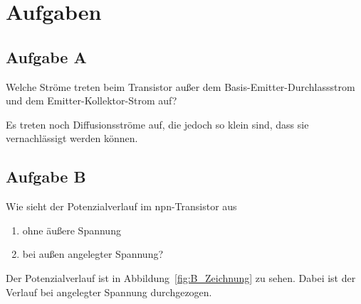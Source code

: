 \fehlt


\FloatBarrier
\section{Aufgaben}

\FloatBarrier
\subsection{Aufgabe A}

\begin{problem}
	Welche Ströme treten beim Transistor außer dem Basis-Emitter-Durchlassstrom
	und dem Emitter-Kollektor-Strom auf?
\end{problem}

Es treten noch Diffusionsströme auf, die jedoch so klein sind, dass sie
vernachlässigt werden können.

\FloatBarrier
\subsection{Aufgabe B}

\begin{problem}
	Wie sieht der Potenzialverlauf im npn-Transistor aus
	\begin{enumerate}
		\item
			ohne äußere Spannung
		\item
			bei außen angelegter Spannung?
	\end{enumerate}
\end{problem}

Der Potenzialverlauf ist in Abbildung~\ref{fig:B_Zeichnung} zu sehen. Dabei ist
der Verlauf bei angelegter Spannung durchgezogen.

